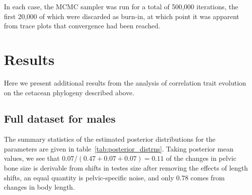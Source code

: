 \documentclass[12pt]{article}
\begin{document}
In each case, the MCMC sampler was run for a total of 500,000 iterations,
the first 20,000 of which were discarded as burn-in,
at which point it was apparent from trace plots that convergence had been reached.


\section*{Results}

Here we present additional results from the analysis of correlation trait evolution on the cetacean phylogeny described above.

\subsection*{Full dataset for males}

The summary statistics of the estimated posterior distributions 
for the parameters
are given in table~\ref{tab:posterior_distrns}.
Taking posterior mean values, we see that $0.07/(0.47+0.07+0.07)=0.11$ of the changes in pelvic bone size 
is derivable from shifts in testes size after removing the effects of length shifts,
an equal quantity is pelvic-specific noise,
and only $0.78$ comes from changes in body length.
\end{document}
